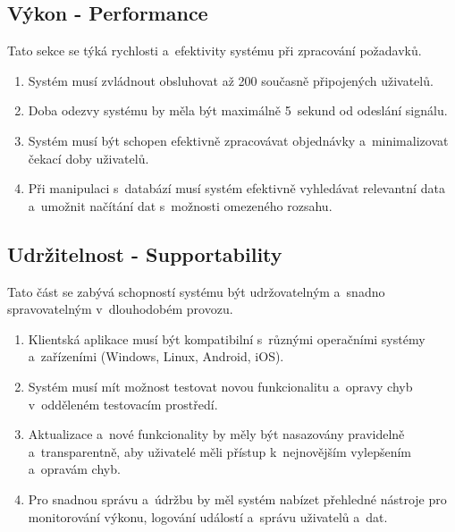 	\subsection{Výkon - Performance}

	Tato sekce se týká rychlosti a~efektivity systému při zpracování požadavků. 	

	\begin{enumerate}[noitemsep,topsep=0pt]
    	\item Systém musí zvládnout obsluhovat až 200 současně připojených uživatelů.
    	\item Doba odezvy systému by měla být maximálně 5~sekund od odeslání signálu.
		\item Systém musí být schopen efektivně zpracovávat objednávky a~minimalizovat čekací doby uživatelů.
    	\item Při manipulaci s~databází musí systém efektivně vyhledávat relevantní data a~umožnit načítání dat s~možnosti omezeného rozsahu.  
	\end{enumerate}

	\subsection{Udržitelnost - Supportability}
	
	Tato část se zabývá schopností systému být udržovatelným a~snadno spravovatelným v~dlouhodobém provozu.
	
	\begin{enumerate}[noitemsep,topsep=0pt]
    	\item Klientská aplikace musí být kompatibilní s~různými operačními systémy a~zařízeními (Windows, Linux, Android, iOS).
		\item Systém musí mít možnost testovat novou funkcionalitu a~opravy chyb v~odděleném testovacím prostředí.
    	\item Aktualizace a~nové funkcionality by měly být nasazovány pravidelně a~transparentně, aby uživatelé měli přístup k~nejnovějším vylepšením a~opravám chyb.
    	\item Pro snadnou správu a~údržbu by měl systém nabízet přehledné nástroje pro monitorování výkonu, logování událostí a~správu uživatelů a~dat.
    \end{enumerate}
	
\pagebreak

